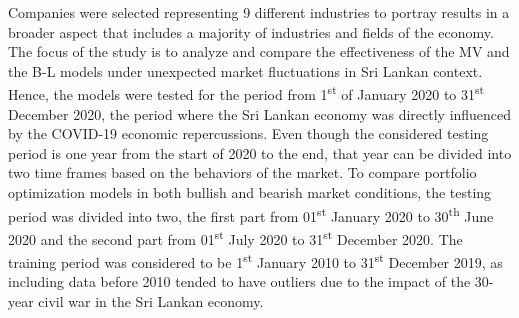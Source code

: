\documentclass[conference]{IEEEtran}
\begin{document}
\begin{table}[htbp]
\caption{Stocks and their Industries}\label{tab1}
\end{table}

Companies were selected representing 9 different industries to portray results in a broader aspect that includes a majority of industries and fields of the economy. The focus of the study is to analyze and compare the effectiveness of the MV and the B-L models under unexpected market fluctuations in Sri Lankan context. Hence, the models were tested for the period from 1\textsuperscript{st} of January 2020 to 31\textsuperscript{st} December 2020, the period where the Sri Lankan economy was directly influenced by the COVID-19 economic repercussions. Even though the considered testing period is one year from the start of 2020 to the end, that year can be divided into two time frames based on the behaviors of the market. To compare portfolio optimization models in both bullish and bearish market conditions, the testing period was divided into two, the first part from 01\textsuperscript{st} January 2020 to 30\textsuperscript{th} June 2020 and the second part from 01\textsuperscript{st} July 2020 to 31\textsuperscript{st} December 2020. The training period was considered to be 1\textsuperscript{st} January 2010 to 31\textsuperscript{st} December 2019, as including data before 2010 tended to have outliers due to the impact of the 30-year civil war in the Sri Lankan economy.
\end{document}
